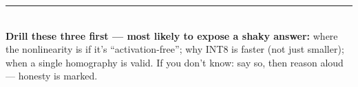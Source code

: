 \documentclass[10pt]{article}
\begin{document}
\vspace{4pt}\noindent\rule{\textwidth}{0.4pt}\\[2pt]
{\footnotesize \textbf{Drill these three first --- most likely to expose a shaky answer:} where the nonlinearity is if it's ``activation-free''; why INT8 is faster (not just smaller); when a single homography is valid. \quad If you don't know: say so, then reason aloud --- honesty is marked.}
\end{document}
